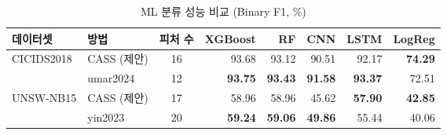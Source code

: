 
\begin{table}[htbp]
\centering
\caption{ML 분류 성능 비교 (Binary F1, \%)}
\label{tab:ml_combined}
\begin{tabular}{llcrrrrr}
\toprule
데이터셋 & 방법 & 피처 수 & XGBoost & RF & CNN & LSTM & LogReg \\
\midrule
\multirow{2}{*}{CICIDS2018}
  & CASS (제안)          & 16 & 93.68          & 93.12          & 90.51          & 92.17          & \textbf{74.29} \\
  & umar2024~\cite{umar2024} & 12 & \textbf{93.75} & \textbf{93.43} & \textbf{91.58} & \textbf{93.37} & 72.51          \\
\midrule
\multirow{2}{*}{UNSW-NB15}
  & CASS (제안)          & 17 & 58.96          & 58.96          & 45.62          & \textbf{57.90} & \textbf{42.85} \\
  & yin2023~\cite{yin2023}   & 20 & \textbf{59.24} & \textbf{59.06} & \textbf{49.86} & 55.44          & 40.06          \\
\bottomrule
\end{tabular}
\end{table}
